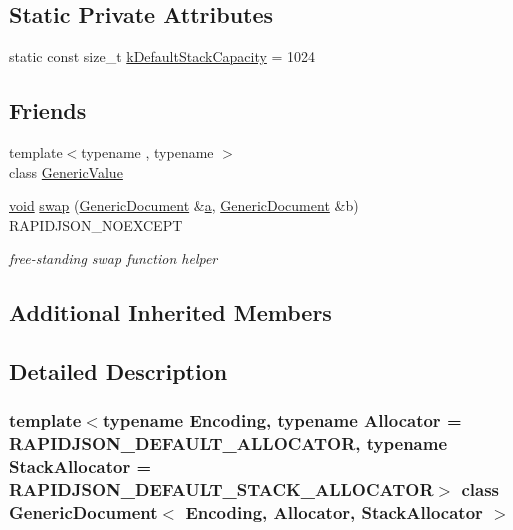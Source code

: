 \subsection*{Static Private Attributes}
\begin{DoxyCompactItemize}
\item 
static const size\+\_\+t \hyperlink{classGenericDocument_a90d452abe8940d8a9c9634d1c49d8f49}{k\+Default\+Stack\+Capacity} = 1024
\end{DoxyCompactItemize}
\subsection*{Friends}
\begin{DoxyCompactItemize}
\item 
{\footnotesize template$<$typename , typename $>$ }\\class \hyperlink{classGenericDocument_a899449e1a645b5e377af059fb61113d8}{Generic\+Value}
\item 
\hyperlink{imgui__impl__opengl3__loader_8h_ac668e7cffd9e2e9cfee428b9b2f34fa7}{void} \hyperlink{classGenericDocument_a0d63efcc43758ac3aed77e868233369d}{swap} (\hyperlink{classGenericDocument}{Generic\+Document} \&\hyperlink{pointer_8h_aeeddce917cf130d62c370b8f216026dd}{a}, \hyperlink{classGenericDocument}{Generic\+Document} \&b) R\+A\+P\+I\+D\+J\+S\+O\+N\+\_\+\+N\+O\+E\+X\+C\+E\+PT
\begin{DoxyCompactList}\small\item\em free-\/standing swap function helper \end{DoxyCompactList}\end{DoxyCompactItemize}
\subsection*{Additional Inherited Members}


\subsection{Detailed Description}
\subsubsection*{template$<$typename Encoding, typename Allocator = R\+A\+P\+I\+D\+J\+S\+O\+N\+\_\+\+D\+E\+F\+A\+U\+L\+T\+\_\+\+A\+L\+L\+O\+C\+A\+T\+OR, typename Stack\+Allocator = R\+A\+P\+I\+D\+J\+S\+O\+N\+\_\+\+D\+E\+F\+A\+U\+L\+T\+\_\+\+S\+T\+A\+C\+K\+\_\+\+A\+L\+L\+O\+C\+A\+T\+OR$>$\newline
class Generic\+Document$<$ Encoding, Allocator, Stack\+Allocator $>$}


